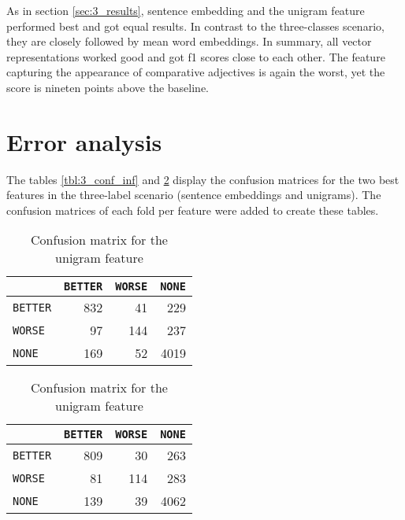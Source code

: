 As in section \ref{sec:3_results}, sentence embedding and the unigram feature performed best and got equal results. In contrast to the three-classes scenario, they are closely followed by mean word embeddings. In summary, all vector representations worked good and got f1 scores close to each other. The feature capturing the appearance of comparative adjectives is again the worst, yet the score is nineten points above the baseline.



\section{Error analysis}

The tables \ref{tbl:3_conf_inf} and \ref{tbl:3_conf_uni} display the confusion matrices for the two best features in the three-label scenario (sentence embeddings and unigrams). The confusion matrices of each fold per feature were added to create these tables.

\begin{table}[h]
    \begin{minipage}{.5\linewidth}
   \caption{Confusion matrix for the sentence embedding feature} 
    \label{tbl:3_conf_inf}

\begin{tabular}{@{}lrrr@{}}
\toprule
       & \texttt{BETTER} & \texttt{WORSE} & \texttt{NONE} \\ \midrule
\texttt{BETTER} & 832       &  41     &  229    \\
\texttt{WORSE}  &    97    &    144   &     237 \\
\texttt{NONE}   &    169    &    52   &    4019  \\ \bottomrule
\end{tabular}


  \end{minipage} \hfill
    \begin{minipage}{.5\linewidth}
  
     \caption{Confusion matrix for the unigram feature} 
       \label{tbl:3_conf_uni}

\begin{tabular}{@{}lrrr@{}}
\toprule
       & \texttt{BETTER} & \texttt{WORSE} & \texttt{NONE} \\ \midrule
\texttt{BETTER} & 809    &   30    &   263   \\
\texttt{WORSE}  & 81     &   114    &    283  \\
\texttt{NONE}   & 139       &   39    &  4062    \\ \bottomrule
\end{tabular}

    \end{minipage} 
\end{table}

